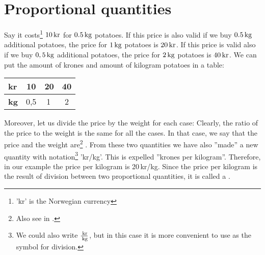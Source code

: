 \section{Proportional quantities \label{Propstorl}}
Say it costs\footnote{'kr' is the Norwegian currency} $ 10\,\textrm{kr}$ for $ 0.5\,\textrm{kg} $ potatoes. If this price is also valid if we buy $ 0.5\,\textrm{kg} $ additional potatoes, the price for $ 1\,\textrm{kg} $ potatoes is $ 20\,\textrm{kr} $. If this price is valid also if we buy  $ 0,5\,\textrm{kg} $ additional potatoes, the price for $ 2\,\textrm{kg} $ potatoes is $ 40\,\textrm{kr} $. We can put the amount of krones and amount of kilogram potatoes in a table:
\begin{center}
	\begin{tabular}{|l|c|c|c|}
		\hline
\textbf{kr} & 10  & 20 & 40 \\ \hline
\textbf{kg} & 0,5 & 1\,& 2\\ \hline
	\end{tabular}
\end{center}
Moreover, let us divide the price by the weight for each case:
Clearly, the ratio of the price to the weight is the same for all the cases. In that case, we say that the price and the weight are\footnote{Also see  in \mb.} . From these two quantities we have also  ''made'' a new quantity with notation\footnote{We could also write $ \frac{\,\textrm{kr}}{\,\textrm{kg}} $, but in this case it is more convenient to use \sym{/} as the symbol for division.} 'kr/kg'. This is expelled ''krones per kilogram''. Therefore, in our example the price per kilogram is 20\,kr/kg. Since the price per kilogram is the result of division between two proportional quantities, it is called a . \regv
{} \regv

